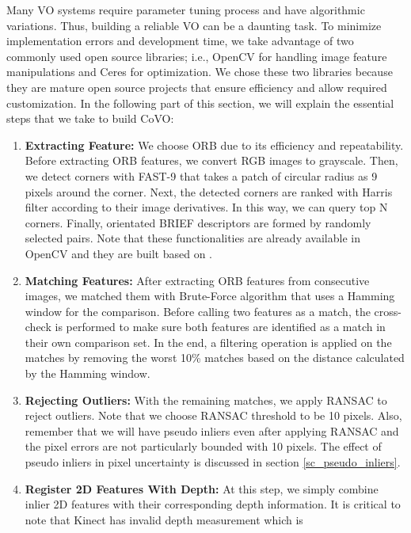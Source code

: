 \documentclass[a4paper]{report}
\numberwithin{figure}{section}
\begin{document}
Many VO systems require parameter tuning process and have algorithmic
variations.  Thus, building a reliable VO can be a daunting task.  To minimize
implementation errors and development time, we take advantage of two commonly
used open source libraries; i.e., OpenCV \parencite{opencv} for handling 
image
feature manipulations and Ceres \parencite{ceres-solver} for optimization. We
chose these two libraries because they are mature open source projects that
ensure efficiency and allow required customization.  In the following part of
this section, we will explain the essential steps that we take to build CoVO:


\begin{enumerate} 
  \item \textbf{Extracting Feature:} We choose ORB due to its efficiency and
    repeatability. Before extracting ORB features, we convert RGB images to
    grayscale. Then, we detect corners with FAST-9 that takes a patch of
    circular radius as 9 pixels around the corner. Next, the detected corners
    are ranked with Harris filter according to their image derivatives. In this
    way, we can query top N corners.  Finally, orientated BRIEF descriptors are
    formed by randomly selected pairs.  Note that these functionalities are
    already available in OpenCV and they are built based on 
    \parencite{Rublee2011a}.  
  \item \textbf{Matching Features:} After extracting ORB features from
    consecutive images, we matched them with Brute-Force algorithm that uses
    a Hamming window for the comparison. Before calling two features as a 
    match,
    the cross-check is performed to make sure both features are identified as a
    match in their own comparison set.  In the end, a filtering operation is
    applied on the matches by removing the worst 10\% matches based on the 
    distance
    calculated by the Hamming window.
  \item \textbf{Rejecting Outliers:} With the remaining matches, we apply
    RANSAC to reject outliers. Note that we choose RANSAC threshold to be 10
    pixels. Also, remember that we will have pseudo inliers even after applying
    RANSAC and the pixel errors are not particularly bounded with 10 pixels.
    The effect of pseudo inliers in pixel uncertainty is discussed in section
    \ref{sc_pseudo_inliers}.
  \item \textbf{Register 2D Features With Depth:} At this step, we simply
    combine inlier 2D features with their corresponding depth information. It
    is critical to note that Kinect has invalid depth measurement which is

\end{enumerate}
\end{document}
